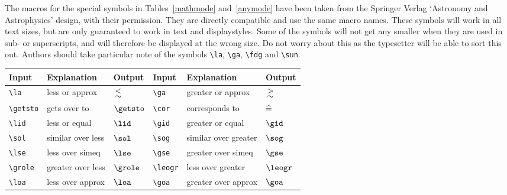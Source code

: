 \documentclass[useAMS,usenatbib]{mn2e}
\begin{document}
The macros for the special symbols in Tables~\ref{mathmode}
and~\ref{anymode} have been taken from the Springer Verlag
`Astronomy and Astrophysics' design, with their permission. They
are directly compatible and use the same macro names. These
symbols will work in all text sizes, but are only guaranteed to
work in text and displaystyles. Some of the symbols will not get
any smaller when they are used in sub- or superscripts, and will
therefore be displayed at the wrong size. Do not worry about this
as the typesetter will be able to sort this out. Authors should
take particular note of the symbols \verb"\la", \verb"\ga",
\verb"\fdg" and \verb"\sun".
%
\begin{table*}
\begin{minipage}{110mm}
\caption{Special symbols which can only be used in math mode.}
\label{mathmode}
\begin{tabular}{@{}llllll}
Input & Explanation & Output & Input & Explanation & Output\\
\hline
\verb"\la"     & less or approx       & $\la$     &
  \verb"\ga"     & greater or approx    & $\ga$\\[2pt]
\verb"\getsto" & gets over to         & $\getsto$ &
  \verb"\cor"    & corresponds to       & $\cor$\\[2pt]
\verb"\lid"    & less or equal        & $\lid$    &
  \verb"\gid"    & greater or equal     & $\gid$\\[2pt]
\verb"\sol"    & similar over less    & $\sol$    &
  \verb"\sog"    & similar over greater & $\sog$\\[2pt]
\verb"\lse"    & less over simeq      & $\lse$    &
  \verb"\gse"    & greater over simeq   & $\gse$\\[2pt]
\verb"\grole"  & greater over less    & $\grole$  &
  \verb"\leogr"  & less over greater    & $\leogr$\\[2pt]
\verb"\loa"    & less over approx     & $\loa$    &
  \verb"\goa"    & greater over approx  & $\goa$\\
\hline
\end{tabular}
\end{minipage}
\end{table*}
%
\end{document}
